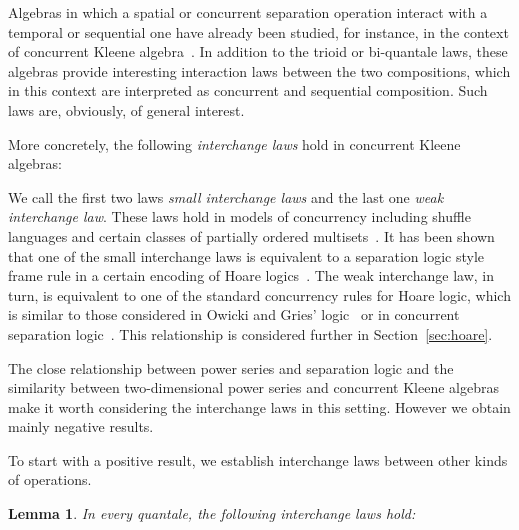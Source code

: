 \documentclass[12pt]{article}
\newtheorem{lemma}{Lemma}
\theoremstyle{definition}
\begin{document}
Algebras in which a spatial or concurrent separation operation
interact with a temporal or sequential one have already been studied,
for instance, in the context of concurrent Kleene
algebra~\cite{HMSW11}. In addition to the trioid or bi-quantale laws,
these algebras provide interesting interaction laws between the two
compositions, which in this context are interpreted as concurrent and
sequential composition.  Such laws are, obviously, of
general interest.

More concretely, the following \emph{interchange laws} hold in
concurrent Kleene algebras:

We call the first two laws \emph{small interchange laws} and the last
one \emph{weak interchange law}.  These laws hold in models of
concurrency including shuffle languages and certain classes of
partially ordered multisets~\cite{Gischer}. It has been shown that one
of the small interchange laws is equivalent to a separation logic style
frame rule in a certain encoding of Hoare logics~\cite{Locality}. The
weak interchange law, in turn, is equivalent to one of the standard
concurrency rules for Hoare logic, which is similar to those
considered in Owicki and Gries' logic~\cite{OG76} or in concurrent
separation logic~\cite{COY07}. This relationship is considered further
in Section~\ref{sec:hoare}.

The close relationship between power series and separation logic and
the similarity between two-dimensional power series and concurrent
Kleene algebras make it worth considering the interchange laws in this
setting.  However we obtain mainly negative results.

To start with a positive result, we establish interchange laws between
other kinds of operations.





\begin{lemma}\label{P:quantaleprops}
  In every quantale, the following interchange laws hold:

\end{lemma}
\end{document}
